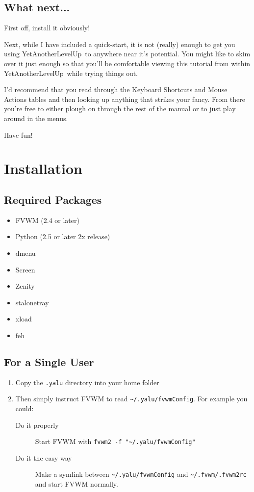\documentclass[a4paper,11pt]{article}
\newcommand{\yalu}{YetAnotherLevelUp}
\begin{document}
		\subsection{What next...}
			First off, install it obviously!
			
			Next, while I have included a quick-start, it is not (really) enough to
			get you using \yalu\ to anywhere near it's potential. You might like to
			skim over it just enough so that you'll be comfortable viewing this
			tutorial from within \yalu\ while trying things out.
			
			I'd recommend that you read through the Keyboard Shortcuts and Mouse
			Actions tables and then looking up anything that strikes your fancy. From
			there you're free to either plough on through the rest of the manual or to
			just play around in the menus.
			
			Have fun!
	
	\section{Installation}
		\subsection{Required Packages}
			\begin{itemize}
				\item FVWM (2.4 or later)
				\item Python (2.5 or later 2x release)
				\item dmenu
				\item Screen
				\item Zenity
				\item stalonetray
				\item xload
				\item feh
			\end{itemize}
		
		\subsection{For a Single User}
			\begin{enumerate}
				\item Copy the \texttt{.yalu} directory into your home folder
				\item Then simply instruct FVWM to read \texttt{\textasciitilde/.yalu/fvwmConfig}. For
					example you could:
					\begin{description}
						\item[Do it properly\texttrademark] Start FVWM with
							\texttt{fvwm2 -f "\textasciitilde/.yalu/fvwmConfig"}
						\item[Do it the easy way] Make a symlink between
							\texttt{\textasciitilde/.yalu/fvwmConfig} and
							\texttt{\textasciitilde/.fvwm/.fvwm2rc} and start FVWM normally.
					\end{description}
			\end{enumerate}
\end{document}

